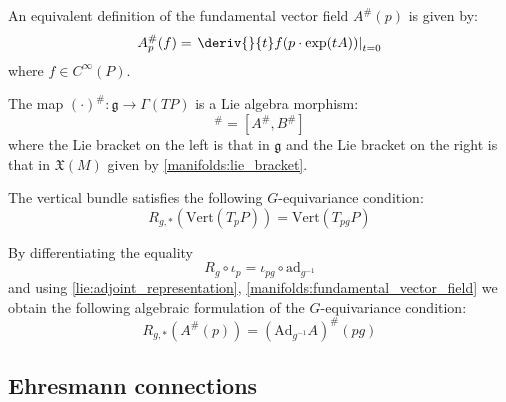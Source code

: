 	\begin{adefinition}
		An equivalent definition of the fundamental vector field $A^\#(p)$ is given by:
		\begin{equation}
			A^\#_p(f) = \left.\deriv{}{t}f(p\cdot\exp(tA))\right|_{t=0}
		\end{equation}
		where $f\in C^\infty(P)$.
	\end{adefinition}
	
	\begin{property}
		The map $(\cdot)^\#:\mathfrak{g}\rightarrow\Gamma(TP)$ is a Lie algebra morphism:
		\begin{equation}
			[A, B]^\# = [A^\#, B^\#]
		\end{equation}
		where the Lie bracket on the left is that in $\mathfrak{g}$ and the Lie bracket on the right is that in $\mathfrak{X}(M)$ given by \ref{manifolds:lie_bracket}.
	\end{property}
	
	\begin{property}
		The vertical bundle satisfies the following $G$-equivariance condition:
		\begin{equation}
			\label{diff:vert_g_equivariance}
			R_{g, \ast}(\text{Vert}(T_pP)) = \text{Vert}(T_{pg}P)
		\end{equation}
		
		By differentiating the equality \[R_g\circ\iota_p = \iota_{pg}\circ\text{ad}_{g^{-1}}\] and using \ref{lie:adjoint_representation}, \ref{manifolds:fundamental_vector_field} we obtain the following algebraic formulation of the $G$-equivariance condition:
		\begin{equation}
			R_{g, \ast}\left(A^\#(p)\right) = \left(\text{Ad}_{g^{-1}}A\right)^\#(pg)
		\end{equation}
	\end{property}
	
\subsection{Ehresmann connections}

